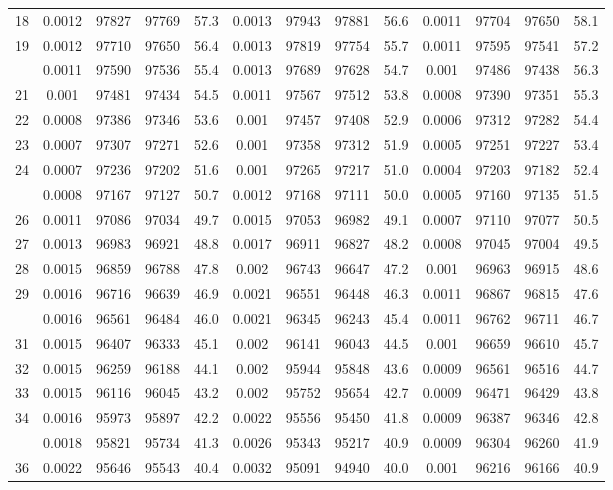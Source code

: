 \documentclass[
  14pt,
]{article}
\begin{document}
\begin{longtable}[t]{lcccccccccccc}
18 & 0.0012 & 97827 & 97769 & 57.3 & 0.0013 & 97943 & 97881 & 56.6 & 0.0011 & 97704 & 97650 & 58.1\\
19 & 0.0012 & 97710 & 97650 & 56.4 & 0.0013 & 97819 & 97754 & 55.7 & 0.0011 & 97595 & 97541 & 57.2\\
\addlinespace
20 & 0.0011 & 97590 & 97536 & 55.4 & 0.0013 & 97689 & 97628 & 54.7 & 0.001 & 97486 & 97438 & 56.3\\
21 & 0.001 & 97481 & 97434 & 54.5 & 0.0011 & 97567 & 97512 & 53.8 & 0.0008 & 97390 & 97351 & 55.3\\
22 & 0.0008 & 97386 & 97346 & 53.6 & 0.001 & 97457 & 97408 & 52.9 & 0.0006 & 97312 & 97282 & 54.4\\
23 & 0.0007 & 97307 & 97271 & 52.6 & 0.001 & 97358 & 97312 & 51.9 & 0.0005 & 97251 & 97227 & 53.4\\
24 & 0.0007 & 97236 & 97202 & 51.6 & 0.001 & 97265 & 97217 & 51.0 & 0.0004 & 97203 & 97182 & 52.4\\
\addlinespace
25 & 0.0008 & 97167 & 97127 & 50.7 & 0.0012 & 97168 & 97111 & 50.0 & 0.0005 & 97160 & 97135 & 51.5\\
26 & 0.0011 & 97086 & 97034 & 49.7 & 0.0015 & 97053 & 96982 & 49.1 & 0.0007 & 97110 & 97077 & 50.5\\
27 & 0.0013 & 96983 & 96921 & 48.8 & 0.0017 & 96911 & 96827 & 48.2 & 0.0008 & 97045 & 97004 & 49.5\\
28 & 0.0015 & 96859 & 96788 & 47.8 & 0.002 & 96743 & 96647 & 47.2 & 0.001 & 96963 & 96915 & 48.6\\
29 & 0.0016 & 96716 & 96639 & 46.9 & 0.0021 & 96551 & 96448 & 46.3 & 0.0011 & 96867 & 96815 & 47.6\\
\addlinespace
30 & 0.0016 & 96561 & 96484 & 46.0 & 0.0021 & 96345 & 96243 & 45.4 & 0.0011 & 96762 & 96711 & 46.7\\
31 & 0.0015 & 96407 & 96333 & 45.1 & 0.002 & 96141 & 96043 & 44.5 & 0.001 & 96659 & 96610 & 45.7\\
32 & 0.0015 & 96259 & 96188 & 44.1 & 0.002 & 95944 & 95848 & 43.6 & 0.0009 & 96561 & 96516 & 44.7\\
33 & 0.0015 & 96116 & 96045 & 43.2 & 0.002 & 95752 & 95654 & 42.7 & 0.0009 & 96471 & 96429 & 43.8\\
34 & 0.0016 & 95973 & 95897 & 42.2 & 0.0022 & 95556 & 95450 & 41.8 & 0.0009 & 96387 & 96346 & 42.8\\
\addlinespace
35 & 0.0018 & 95821 & 95734 & 41.3 & 0.0026 & 95343 & 95217 & 40.9 & 0.0009 & 96304 & 96260 & 41.9\\
36 & 0.0022 & 95646 & 95543 & 40.4 & 0.0032 & 95091 & 94940 & 40.0 & 0.001 & 96216 & 96166 & 40.9\\

\end{longtable}
\end{document}
